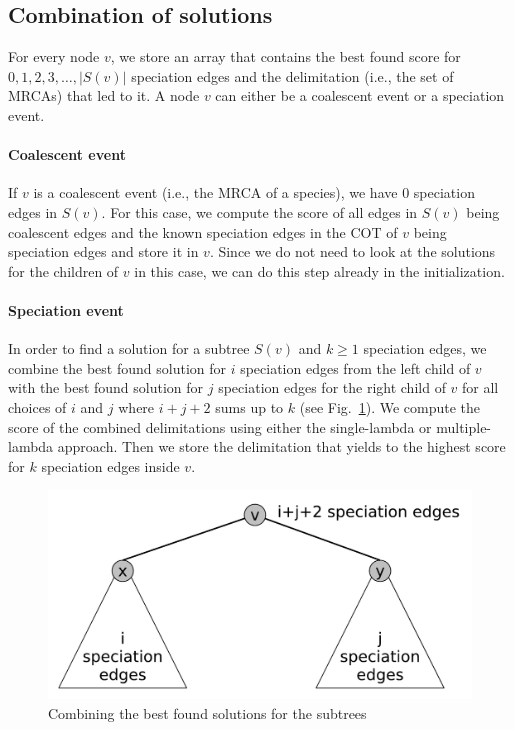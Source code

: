 \documentclass{llncs}
\begin{document}
\subsection{Combination of solutions}

For every node $v$, we store an array that contains the best found score for $0, 1, 2, 3, \ldots, |S(v)|$ speciation edges and the delimitation (i.e., the set of MRCAs) that led to it. A node $v$ can either be a coalescent event or a speciation event.

\paragraph{Coalescent event}
If $v$ is a coalescent event (i.e., the MRCA of a species), we have $0$ speciation edges in $S(v)$. For this case, we compute the score of all edges in $S(v)$ being coalescent edges and the known speciation edges in the COT of $v$ being speciation edges and store it in $v$. Since we do not need to look at the solutions for the children of $v$ in this case, we can do this step already in the initialization.

\paragraph{Speciation event}
In order to find a solution for a subtree $S(v)$ and $k \geq 1$ speciation edges, we combine the best found solution for $i$ speciation edges from the left child of $v$ with the best found solution for $j$ speciation edges for the right child of $v$ for all choices of $i$ and $j$ where $i+j+2$ sums up to $k$ (see Fig.~\ref{fig:combining}). We compute the score of the combined delimitations using either the single-lambda or multiple-lambda approach. Then we store the delimitation that yields to the highest score for $k$ speciation edges inside $v$.

\begin{figure}[h!]
\centering
\includegraphics[scale=0.3]{images/speciation_events.pdf}
\caption{Combining the best found solutions for the subtrees}
\label{fig:combining}
\end{figure}
\end{document}
